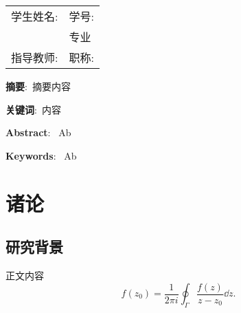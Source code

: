 \documentclass[UTF8,heading=true,12pt,font=songti]{article}
\author{NAME} %
\begin{document}
	\maketitle%
	\newpage
	\tableofcontents%
	\setcounter{page}{0}%
	\thispagestyle{empty}%
	\newpage
	\begin{center}
		\bfseries{\the\zhtitle}%
	\end{center}
	
	\begin{table}[H]
		\vspace{-1.5em}
		\centering
		\begin{spacing}{1.5}
			\begin{tabular}{rl} %
				学生姓名: {\the\author} & 学号: {\the\serialnumber}\\ 
				{\the\college} & {\the\major}专业\\
				指导教师: {\the\advisor} & 职称: {\the\advisors}\\	
			\end{tabular}
		\end{spacing}
		\vspace{-1.5em}
	\end{table}
	
	{\heiti {}\bfseries{摘\quad 要}}:{\kaishu{}\ 摘要内容} %
	
	
	{\heiti {}\bfseries{关键词}}:{\kaishu{}\ 内容}%
	
	\begin{center}
	\end{center}
	
	{\bfseries{Abstract}}:\  Ab
	
	{\bfseries{Keywords}}:\  Ab
	
	\section{诸论}
	\subsection{研究背景}
	正文内容
	$$
	f(z_0)=\frac{1}{2\pi i}\oint_{\Gamma}\frac{f(z)}{z-z_0}\dd z.
	$$
	
\end{document}
